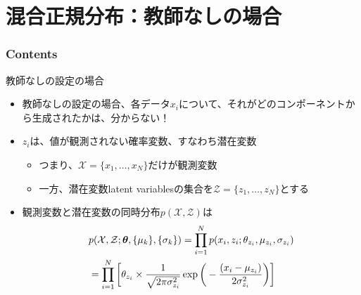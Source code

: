 \documentclass[aspectratio=169,unicode,dvipdfmx,14pt]{beamer}
\begin{document}
\section{混合正規分布：教師なしの場合}

\begin{frame}\frametitle{Contents}
\Large \tableofcontents[currentsection]
\end{frame}


\begin{frame}{教師なしの設定の場合}
\vspace{-.05in}
\begin{itemize}
\item 教師なしの設定の場合、各データ$x_i$について、それがどのコンポーネントから生成されたかは、分からない！
\item $z_i$は、値が観測されない確率変数、すなわち潜在変数
\begin{itemize}
\item つまり、$\mathcal{X} = \{ x_1, \ldots, x_N \}$だけが観測変数
\item 一方、潜在変数latent variablesの集合を$\mathcal{Z} = \{ z_1, \ldots, z_N \}$とする
\end{itemize}
\item 観測変数と潜在変数の同時分布$p(\mathcal{X}, \mathcal{Z})$は
\vspace{-.13in}
\begin{align}
& p(\mathcal{X}, \mathcal{Z};\bm{\theta},\{ \mu_k \}, \{ \sigma_k \})
= \prod_{i=1}^N p(x_i, z_i ; \theta_{z_i}, \mu_{z_i}, \sigma_{z_i})
\notag \\ &
= \prod_{i=1}^N \bigg[ \theta_{z_i} \times \frac{1}{\sqrt{2\pi\sigma_{z_i}^2}}\exp\bigg( - \frac{(x_i - \mu_{z_i})}{2\sigma_{z_i}^2} \bigg) \bigg]
\end{align}
\end{itemize}
\end{frame}
\end{document}
